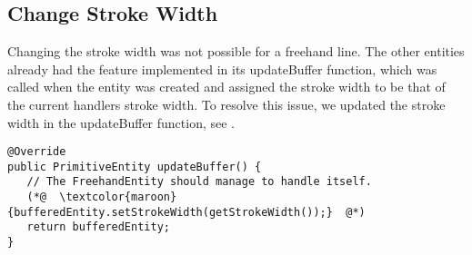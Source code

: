 \subsection{Change Stroke Width}
Changing the stroke width was not possible for a freehand line.
The other entities already had the feature implemented in its updateBuffer function, which was called when the entity was created and assigned the stroke width to be that of the current handlers stroke width.
To resolve this issue, we updated the stroke width in the updateBuffer function, see \lstref{}.

\begin{lstlisting}[caption={The change is highlighted in red}, label]
@Override
public PrimitiveEntity updateBuffer() {
   // The FreehandEntity should manage to handle itself.
   (*@  \textcolor{maroon}{bufferedEntity.setStrokeWidth(getStrokeWidth());}  @*)
   return bufferedEntity;
}
\end{lstlisting}